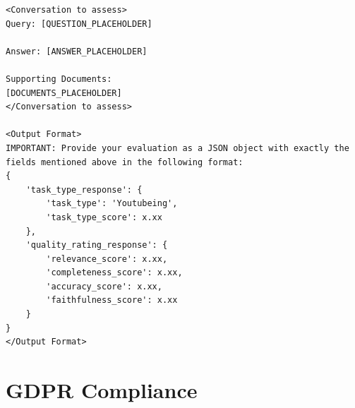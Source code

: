 \documentclass[
	english,
	ruledheaders=section,%
	class=report,%
	thesis={type=bachelor},%
	accentcolor=1b,%
	custommargins=true,%
	marginpar=false,%
	parskip=half-,%
	fontsize=11pt,%
	DIV=14,
]{tudapub}
\begin{document}
\begin{lstlisting}[caption={Prompt Template for AI based quality and task type Evaluation}, label={lst:prompt_template}]
<Conversation to assess>
Query: [QUESTION_PLACEHOLDER]

Answer: [ANSWER_PLACEHOLDER]

Supporting Documents:
[DOCUMENTS_PLACEHOLDER]
</Conversation to assess>

<Output Format>
IMPORTANT: Provide your evaluation as a JSON object with exactly the fields mentioned above in the following format:
{
    'task_type_response': {
        'task_type': 'Youtubeing',
        'task_type_score': x.xx
    },
    'quality_rating_response': {
        'relevance_score': x.xx,
        'completeness_score': x.xx,
        'accuracy_score': x.xx,
        'faithfulness_score': x.xx
    }
}
</Output Format>
\end{lstlisting}
\section*{GDPR Compliance}
\end{document}
